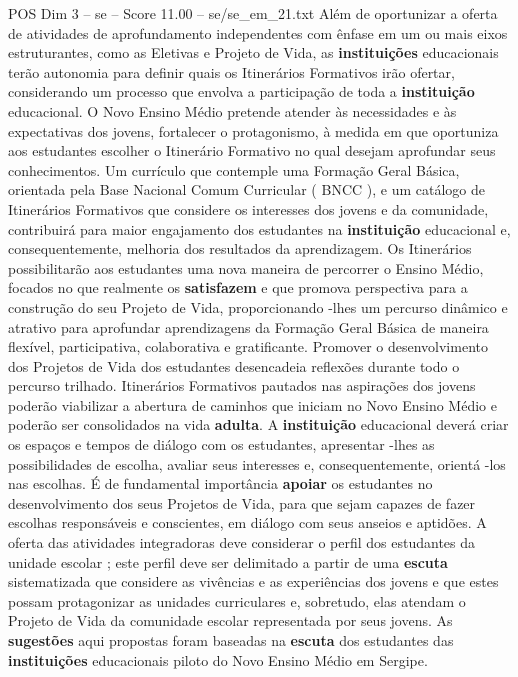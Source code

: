 \begin{textsample}{POS Dim 3 – se – Score 11.00 – se/se\_em\_21.txt}
Além de oportunizar a oferta de atividades de aprofundamento independentes com ênfase em um ou mais eixos estruturantes, como as Eletivas e Projeto de Vida, as \textbf{instituições} educacionais terão autonomia para definir quais os Itinerários Formativos irão ofertar, considerando um processo que envolva a participação de toda a \textbf{instituição} educacional.
O Novo Ensino Médio pretende atender às necessidades e às expectativas dos jovens, fortalecer o protagonismo, à medida em que oportuniza aos estudantes escolher o Itinerário Formativo no qual desejam aprofundar seus conhecimentos.
Um currículo que contemple uma Formação Geral Básica, orientada pela Base Nacional Comum Curricular ( BNCC ), e um catálogo de Itinerários Formativos que considere os interesses dos jovens e da comunidade, contribuirá para maior engajamento dos estudantes na \textbf{instituição} educacional e, consequentemente, melhoria dos resultados da aprendizagem.
Os Itinerários possibilitarão aos estudantes uma nova maneira de percorrer o Ensino Médio, focados no que realmente os \textbf{satisfazem} e que promova perspectiva para a construção do seu Projeto de Vida, proporcionando -lhes um percurso dinâmico e atrativo para aprofundar aprendizagens da Formação Geral Básica de maneira flexível, participativa, colaborativa e gratificante.
Promover o desenvolvimento dos Projetos de Vida dos estudantes desencadeia reflexões durante todo o percurso trilhado.
Itinerários Formativos pautados nas aspirações dos jovens poderão viabilizar a abertura de caminhos que iniciam no Novo Ensino Médio e poderão ser consolidados na vida \textbf{adulta}.
A \textbf{instituição} educacional deverá criar os espaços e tempos de diálogo com os estudantes, apresentar -lhes as possibilidades de escolha, avaliar seus interesses e, consequentemente, orientá -los nas escolhas.
É de fundamental importância \textbf{apoiar} os estudantes no desenvolvimento dos seus Projetos de Vida, para que sejam capazes de fazer escolhas responsáveis e conscientes, em diálogo com seus anseios e aptidões.
A oferta das atividades integradoras deve considerar o perfil dos estudantes da unidade escolar ; este perfil deve ser delimitado a partir de uma \textbf{escuta} sistematizada que considere as vivências e as experiências dos jovens e que estes possam protagonizar as unidades curriculares e, sobretudo, elas atendam o Projeto de Vida da comunidade escolar representada por seus jovens.
As \textbf{sugestões} aqui propostas foram baseadas na \textbf{escuta} dos estudantes das \textbf{instituições} educacionais piloto do Novo Ensino Médio em Sergipe.

\end{textsample}
